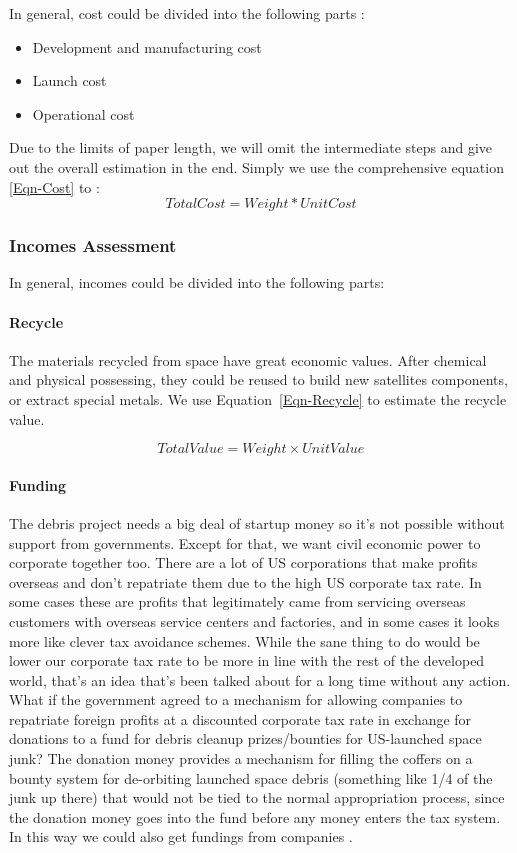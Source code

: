 \documentclass{mcmthesis}
\begin{document}
	In general, cost could be divided into the following parts \cite{Braun}:
	\begin{itemize}
		\item Development and manufacturing cost
		\item Launch cost
		\item Operational cost
	\end{itemize}
	
	Due to the limits of paper length, we will omit the intermediate steps and give out the overall estimation in the end. Simply we use the comprehensive equation \eqref{Eqn-Cost} to :
	\begin{equation}\label{Eqn-Cost}
	Total Cost = Weight * Unit Cost
	\end{equation}
	
\subsubsection{Incomes Assessment}
	In general, incomes could be divided into the following parts:
	\paragraph{Recycle}
	The materials recycled from space have great economic values. After chemical and physical possessing,  they could be reused to build new satellites components, or extract special metals. We use Equation~\eqref{Eqn-Recycle} to estimate the recycle value.
	
	\begin{equation}\label{Eqn-Recycle}
	Total Value = Weight \times Unit Value
	\end{equation}
	
	\paragraph{Funding}
	The debris project needs a big deal of startup money so it's not possible without support from governments.
	Except for that, we want civil economic power to corporate together too. There are a lot of US corporations that make profits overseas and don't repatriate them due to the high US corporate tax rate. In some cases these are profits that legitimately came from servicing overseas customers with overseas service centers and factories, and in some cases it looks more like clever tax avoidance schemes. While the sane thing to do would be lower our corporate tax rate to be more in line with the rest of the developed world, that's an idea that's been talked about for a long time without any action. What if the government agreed to a mechanism for allowing companies to repatriate foreign profits at a discounted corporate tax rate in exchange for donations to a fund for debris cleanup prizes/bounties for US-launched space junk? The donation money provides a mechanism for filling the coffers on a bounty system for de-orbiting launched space debris (something like 1/4 of the junk up there) that would not be tied to the normal appropriation process, since the donation money goes into the fund before any money enters the tax system. In this way we could also get fundings from companies \cite{Oliver}.
	
\end{document}

